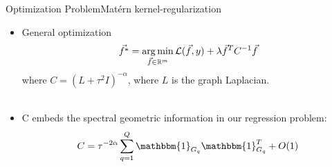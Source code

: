 	\begin{frame}{Optimization Problem}{Matérn kernel-regularization}
		\begin{itemize}
			\item General optimization
			\[\vec{f^*} = \operatorname*{arg\,min}_{\vec{f} \in \mathbb{R}^{m}} \mathcal{L}(\vec{f},y) + \lambda \vec{f}^{T}C^{-1}\vec{f}\]
			where $C = (L + \tau^2 I)^{-\alpha}$, where $L$ is the graph Laplacian.
			\\ ~ \
			\item C embeds the spectral geometric information in our regression problem:
			\[
				C = \tau^{-2\alpha} \sum_{q=1}^{Q}\mathbbm{1}_{G_q}\mathbbm{1}_{G_q}^T + O(1)	
			\]
		\end{itemize}
	\end{frame}